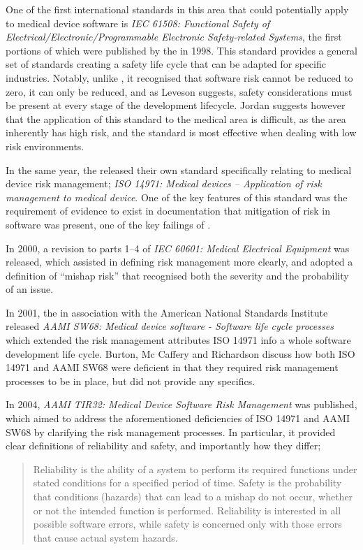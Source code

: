 \documentclass{cshonours}
\begin{document}
One of the first international standards in this area that could potentially apply to medical device software is \textit{IEC 61508: Functional Safety of Electrical/Electronic/Programmable Electronic Safety-related Systems}, the first portions of which were published by the \iec in 1998. This standard provides a general set of standards creating a safety life cycle that can be adapted for specific industries. Notably, unlike \ther, it recognised that software risk cannot be reduced to zero, it can only be reduced, and as Leveson suggests, safety considerations must be present at every stage of the development lifecycle. \cite{iec61508} Jordan suggests however that the application of this standard to the medical area is difficult, as the area inherently has high risk, and the standard is most effective when dealing with low risk environments. \cite{jordan2006standard} 

In the same year, the \iso released their own standard specifically relating to medical device risk management; \textit{ISO 14971: Medical devices -- Application of risk management to medical device}. One of the key features of this standard was the requirement of evidence to exist in documentation that mitigation of risk in software was present, one of the key failings of \aecl. \cite{rakitin2006coping}

In 2000, a revision to parts 1--4 of \textit{IEC 60601: Medical Electrical Equipment} was released, which assisted in defining risk management more clearly, and adopted a definition of ``mishap risk'' that recognised both the severity and the probability of an issue. \cite{rakitin2006coping}

In 2001, the \aami in association with the American National Standards Institute released \textit{AAMI SW68: Medical device software - Software life cycle processes} which extended the risk management attributes ISO 14971 info a whole software development life cycle. \cite{rakitin2006coping} Burton, Mc Caffery and Richardson discuss how both ISO 14971 and AAMI SW68 were deficient in that they required risk management processes to be in place, but did not provide any specifics. \cite{burton2006risk}

In 2004, \textit{AAMI TIR32: Medical Device Software Risk Management} was published, which aimed to address the aforementioned deficiencies of ISO 14971 and AAMI SW68 by clarifying the risk management processes. \cite{rakitin2006coping} In particular, it provided clear definitions of reliability and safety, and importantly how they differ;
\begin{quote}
Reliability is the ability of a system to perform its required functions under stated conditions for a specified period of time. Safety is the probability that conditions (hazards) that can lead to a mishap do not occur, whether or not the intended function is performed. Reliability is interested in all possible software errors, while safety is concerned only with those errors that cause actual system hazards. \cite{aamitir32}
\end{quote}
\end{document}

